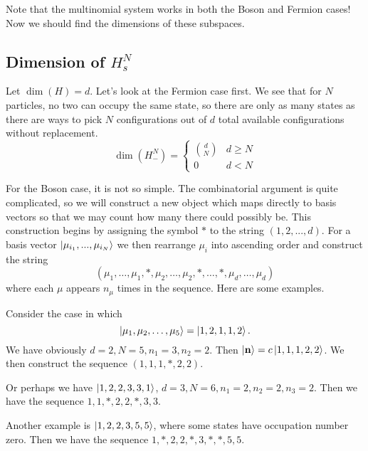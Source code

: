 Note that the multinomial system works in both the Boson and Fermion cases! Now we should find the dimensions of these subspaces.

\subsection{Dimension of $H_s^N$}

Let $\dim(H)=d$. Let's look at the Fermion case first. We see that for $N$ particles, no two can occupy the same state, so there are only as many states as there are ways to pick $N$ configurations out of $d$ total available configurations without replacement.
\begin{equation}
\dim(H_{-}^N) = \begin{cases}  {d\choose N} & d\geq N \\ 0 & d < N\end{cases}
\end{equation}

For the Boson case, it is not so simple. The combinatorial argument is quite complicated, so we will construct a new object which maps directly to basis vectors so that we may count how many there could possibly be. This construction begins by assigning the symbol $*$ to the string $\left(1,2,...,d\right)$. For a basis vector $\ket{\mu_{i_1},...,\mu_{i_N}}$ we then rearrange $\mu_i$ into ascending order and construct the string \[\left(\mu_{1},\dots,\mu_{1},*,\mu_{2},\dots,\mu_{2},*,\dots,*,\mu_{d},\dots,\mu_d\right)\] 
where each $\mu$ appears $n_\mu$ times in the sequence. Here are some examples.

\begin{example}
	Consider the case in which 
	\[\ket{\mu_1, \mu_{2},\dots, \mu_{5}}=\ket{1,2,1,1,2}. \]
	We have obviously $d=2,N=5,n_1=3,n_2=2$. Then $\ket{\mathbf{n}} = c\ket{1,1,1,2,2}$. We then construct the sequence $\left(1,1,1,*,2,2\right)$.
\end{example}
\begin{example}
	Or perhaps we have $\ket{1,2,2,3,3,1}$, $d=3,N=6,n_1=2,n_2=2,n_3=2$. Then we have the sequence $1,1,*,2,2,*,3,3$.
\end{example}

\begin{example}
	Another example is $\ket{1,2,2,3,5,5}$, where some states have occupation number zero. Then we have the sequence $1,*,2,2,*,3,*,*,5,5$.
\end{example}

